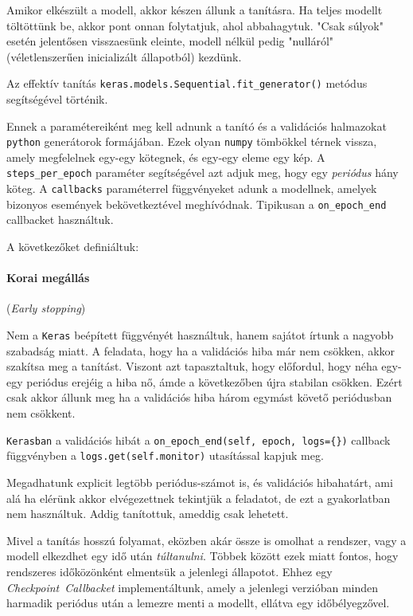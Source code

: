 Amikor elkészült a modell, akkor készen állunk a tanításra. Ha teljes modellt töltöttünk be,
akkor pont onnan folytatjuk, ahol abbahagytuk. "Csak súlyok" esetén jelentősen visszaesünk 
eleinte, modell nélkül pedig "nulláról"(véletlenszerűen inicializált állapotból) kezdünk.

Az effektív tanítás \texttt{keras.models.Sequential.fit\_generator()} metódus segítségével 
történik.

Ennek a paramétereiként meg kell adnunk a tanító és a validációs halmazokat \texttt{python} 
generátorok formájában. Ezek olyan \texttt{numpy} tömbökkel térnek vissza, amely megfelelnek 
egy-egy kötegnek, és egy-egy eleme egy kép. A \texttt{steps\_per\_epoch} paraméter segítségével azt adjuk
meg, hogy egy \textit{periódus} hány köteg. A \texttt{callbacks} paraméterrel függvényeket
adunk a modellnek, amelyek bizonyos események bekövetkeztével meghívódnak. Tipikusan a
\texttt{on\_epoch\_end} callbacket használtuk.

\noindent
A következőket definiáltuk:

\paragraph{Korai megállás} (\textit{Early stopping})

Nem a \texttt{Keras} beépített függvényét használtuk, hanem sajátot írtunk a
nagyobb szabadság miatt. A feladata, hogy ha a validációs hiba már nem csökken, akkor 
szakítsa meg a tanítást. Viszont azt tapasztaltuk, hogy előfordul, hogy néha
egy-egy periódus erejéig a hiba nő, ámde a következőben újra stabilan csökken.
Ezért csak akkor állunk meg ha a validációs hiba három egymást követő periódusban
nem csökkent.

\texttt{Kerasban} a validációs hibát a \texttt{on\_epoch\_end(self, epoch, logs=\{\})} 
callback függvényben a \texttt{logs.get(self.monitor)} utasítással kapjuk meg.

Megadhatunk explicit legtöbb periódus-számot is, és validációs hibahatárt, ami alá ha
elérünk akkor elvégezettnek tekintjük a feladatot, de ezt a gyakorlatban nem használtuk.
Addig tanítottuk, ameddig csak lehetett.


Mivel a tanítás hosszú folyamat, eközben akár össze is omolhat a rendszer, vagy
a modell elkezdhet egy idő után \textit{túltanulni}. Többek között ezek miatt fontos,
hogy rendszeres időközönként elmentsük a jelenlegi állapotot. Ehhez egy 
\textit{Checkpoint~Callbacket} implementáltunk, amely a jelenlegi verzióban minden harmadik
periódus után a lemezre menti a modellt, ellátva egy időbélyegzővel.



